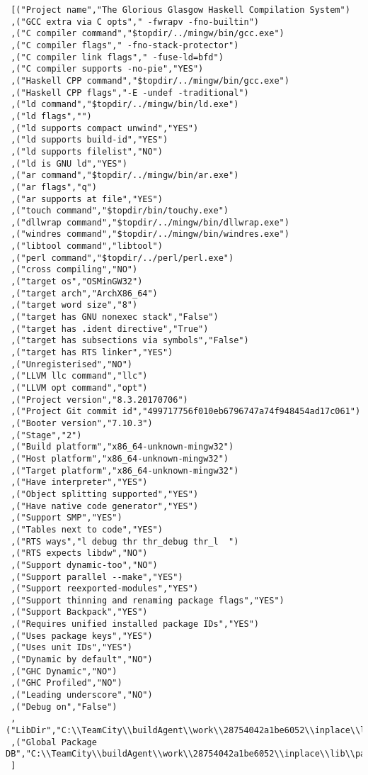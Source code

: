\begin{verbatim}
 [("Project name","The Glorious Glasgow Haskell Compilation System")
 ,("GCC extra via C opts"," -fwrapv -fno-builtin")
 ,("C compiler command","$topdir/../mingw/bin/gcc.exe")
 ,("C compiler flags"," -fno-stack-protector")
 ,("C compiler link flags"," -fuse-ld=bfd")
 ,("C compiler supports -no-pie","YES")
 ,("Haskell CPP command","$topdir/../mingw/bin/gcc.exe")
 ,("Haskell CPP flags","-E -undef -traditional")
 ,("ld command","$topdir/../mingw/bin/ld.exe")
 ,("ld flags","")
 ,("ld supports compact unwind","YES")
 ,("ld supports build-id","YES")
 ,("ld supports filelist","NO")
 ,("ld is GNU ld","YES")
 ,("ar command","$topdir/../mingw/bin/ar.exe")
 ,("ar flags","q")
 ,("ar supports at file","YES")
 ,("touch command","$topdir/bin/touchy.exe")
 ,("dllwrap command","$topdir/../mingw/bin/dllwrap.exe")
 ,("windres command","$topdir/../mingw/bin/windres.exe")
 ,("libtool command","libtool")
 ,("perl command","$topdir/../perl/perl.exe")
 ,("cross compiling","NO")
 ,("target os","OSMinGW32")
 ,("target arch","ArchX86_64")
 ,("target word size","8")
 ,("target has GNU nonexec stack","False")
 ,("target has .ident directive","True")
 ,("target has subsections via symbols","False")
 ,("target has RTS linker","YES")
 ,("Unregisterised","NO")
 ,("LLVM llc command","llc")
 ,("LLVM opt command","opt")
 ,("Project version","8.3.20170706")
 ,("Project Git commit id","499717756f010eb6796747a74f948454ad17c061")
 ,("Booter version","7.10.3")
 ,("Stage","2")
 ,("Build platform","x86_64-unknown-mingw32")
 ,("Host platform","x86_64-unknown-mingw32")
 ,("Target platform","x86_64-unknown-mingw32")
 ,("Have interpreter","YES")
 ,("Object splitting supported","YES")
 ,("Have native code generator","YES")
 ,("Support SMP","YES")
 ,("Tables next to code","YES")
 ,("RTS ways","l debug thr thr_debug thr_l  ")
 ,("RTS expects libdw","NO")
 ,("Support dynamic-too","NO")
 ,("Support parallel --make","YES")
 ,("Support reexported-modules","YES")
 ,("Support thinning and renaming package flags","YES")
 ,("Support Backpack","YES")
 ,("Requires unified installed package IDs","YES")
 ,("Uses package keys","YES")
 ,("Uses unit IDs","YES")
 ,("Dynamic by default","NO")
 ,("GHC Dynamic","NO")
 ,("GHC Profiled","NO")
 ,("Leading underscore","NO")
 ,("Debug on","False")
 ,("LibDir","C:\\TeamCity\\buildAgent\\work\\28754042a1be6052\\inplace\\lib")
 ,("Global Package DB","C:\\TeamCity\\buildAgent\\work\\28754042a1be6052\\inplace\\lib\\package.conf.d")
 ]
\end{verbatim}

